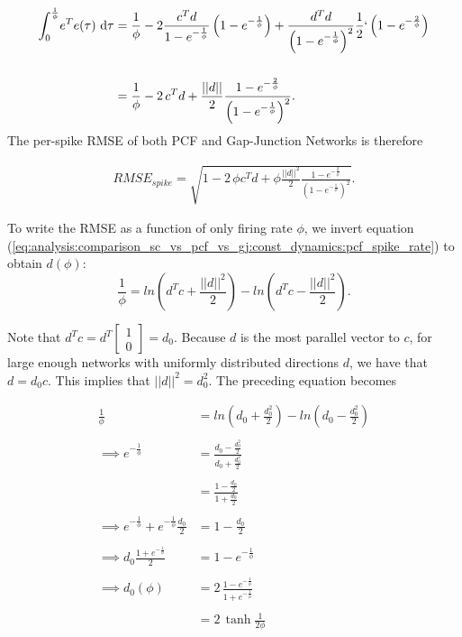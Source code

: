 \begin{align*}
 \int_
	{	
		0
	}
	^
	{
		\frac
		{
			1
		}
		{
			\phi
		}
	}
	 \!  e^T e(\tau)\, \, \mathrm{d} \tau
	 &= 
	 \frac{1}{\phi}
	 - 
	 2 \frac{ c^T d } {1 - e^{-\frac{1}{\phi}}}  
	 \left(
	 	1 - e^{-\frac{1}{\phi}}
     \right)
	 + 
	 \frac
	 {
		d^T d
	 }
	 {
		\left(1 - e^{-\frac{1}{\phi}}\right)^2
	 }
	 \frac{1}{2}`
	 \left(
	 	1 - e^{-\frac{2}{\phi}}
     \right)
     \\
     \\
     &= 
	 \frac{1}{\phi}
	 - 
	 2 \,  c^T d 
	 + 
 	 \frac{||d||}{2}
	 \frac
	 {
		1 - e^{-\frac{2}{\phi}}
	 }
	 {
		\left(1 - e^{-\frac{1}{\phi}}\right)^2
	 }.
\end{align*}
The per-spike RMSE of both PCF and Gap-Junction Networks is therefore

\begin{align*}
	RMSE_{spike} = 
	\sqrt{
		1
		-
		2 \, \phi  c^T d 
		 + 
	 	\phi \frac{||d||^2}{2}
		\frac
		{
			1 - e^{-\frac{2}{\phi}}
		}
		{
			\left(1 - e^{-\frac{1}{\phi}}\right)^2
		}
	}.
\end{align*}

To write the RMSE as a function of only firing rate $\phi$, we invert equation (\ref{eq:analysis:comparison_sc_vs_pcf_vs_gj:const_dynamics:pcf_spike_rate}) to obtain $d(\phi)$:
$$
\frac{1}{\phi} = 
ln
\left(
	d^T c + \frac{||d||^2}{2}
\right)
-
ln 
\left(
	d^T c - \frac{||d||^2}{2}
\right). 
$$ 

Note that $d^T c = d^T \begin{bmatrix} 1 \\ 0 \end{bmatrix} = d_0$. Because $d$ is the most parallel vector to $c$, for large enough networks with uniformly distributed directions $d$, we have that $d = d_0  c$. This implies that $||d||^2 = d_0^2$. The preceding equation becomes

\begin{align*}
\frac{1}{\phi} &= 
ln
\left(
	d_0+ \frac{d_0^2}{2}
\right)
-
ln 
\left(
	d_0 - \frac{d_0^2}{2}
\right)
\\
\\
\implies
e^{-\frac{1}{\phi}}
&= 
\frac
{
	d_0 - \frac{d_0^2}{2}
}
{
	d_0 + \frac{d_0^2}{2}
}
\\
\\
&= 
\frac
{
	1 - \frac{d_0}{2}
}
{
	1 + \frac{d_0}{2}
}
\\
\\
\implies
e^{-\frac{1}{\phi}} + e^{-\frac{1}{\phi}} \frac{d_0}{2}
&= 
1 - \frac{d_0}{2}
\\
\\
\implies
d_0
\frac{
1 + e^{-\frac{1}{\phi}} 
}
{2}
&=
1 - e^{-\frac{1}{\phi}}
\\
\\
\implies
d_0(\phi) &=
2\, \frac
{
	1 - e^{-\frac{1}{\phi}}
}
{
	1 + e^{-\frac{1}{\phi}}
}
\\
\\
&= 
2 \, \tanh
{
	\frac{1}{2\phi}
}
\end{align*}

